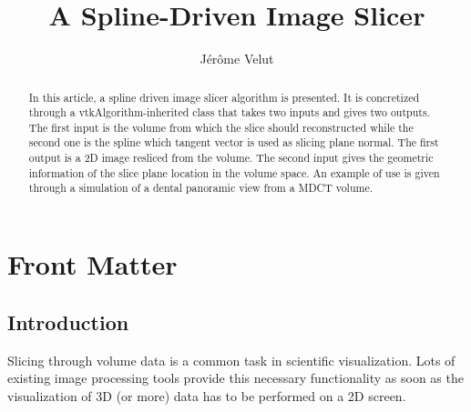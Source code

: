 \documentclass{InsightArticle}
\title{A Spline-Driven Image Slicer}
\author{J\'er\^ome Velut}
\newcommand{\IJhandlerIDnumber}{xxxx}
\begin{document}
%
% 
\IJhandlefooter{\IJhandlerIDnumber}


\ifpdf
\else
\fi


\maketitle


\ifhtml
\chapter*{Front Matter\label{front}}
\fi


\begin{abstract}
\noindent
In this article, a spline driven image slicer algorithm is presented. It is
concretized through a vtkAlgorithm-inherited class that takes two inputs and
gives two outputs. The first input is the volume from which the slice should
reconstructed while the second one is the spline which tangent vector is used as
slicing plane normal. The first output is a 2D image resliced from the volume.
The second input gives the geometric information of the slice plane location in
the volume space. An example of use is given through a simulation of a dental
panoramic view from a MDCT volume.
\end{abstract}

\IJhandlenote{\IJhandlerIDnumber}

\tableofcontents
%
\section*{Introduction}
%
Slicing through volume data is a common task in scientific visualization. Lots
of existing image processing tools provide this necessary functionality as soon
as the visualization of 3D (or more) data has to be performed on a 2D screen.
\end{document}
